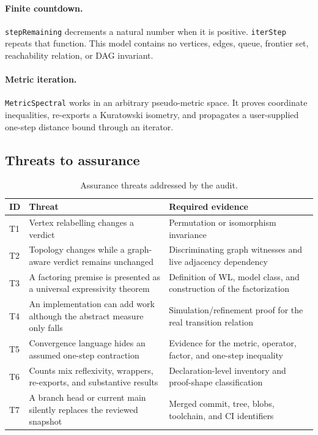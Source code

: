\documentclass[10pt,letterpaper]{article}
\theoremstyle{definition}
\begin{document}
\paragraph{Finite countdown.}
\texttt{stepRemaining} decrements a natural number when it is positive.
\texttt{iterStep} repeats that function. This model contains no vertices,
edges, queue, frontier set, reachability relation, or DAG invariant.

\paragraph{Metric iteration.}
\texttt{MetricSpectral} works in an arbitrary pseudo-metric space. It proves
coordinate inequalities, re-exports a Kuratowski isometry, and propagates a
user-supplied one-step distance bound through an iterator.

\subsection{Threats to assurance}
\begin{table}[ht]
\centering
\small
\begin{tabularx}{\textwidth}{@{}L{0.11\textwidth}L{0.28\textwidth}Y@{}}
\toprule
ID & Threat & Required evidence \\
\midrule
T1 & Vertex relabelling changes a verdict & Permutation or isomorphism invariance \\
T2 & Topology changes while a graph-aware verdict remains unchanged &
Discriminating graph witnesses and live adjacency dependency \\
T3 & A factoring premise is presented as a universal expressivity theorem &
Definition of WL, model class, and construction of the factorization \\
T4 & An implementation can add work although the abstract measure only falls &
Simulation/refinement proof for the real transition relation \\
T5 & Convergence language hides an assumed one-step contraction &
Evidence for the metric, operator, factor, and one-step inequality \\
T6 & Counts mix reflexivity, wrappers, re-exports, and substantive results &
Declaration-level inventory and proof-shape classification \\
T7 & A branch head or current main silently replaces the reviewed snapshot &
Merged commit, tree, blobs, toolchain, and CI identifiers \\
\bottomrule
\end{tabularx}
\caption{Assurance threats addressed by the audit.}
\label{tab:threats}
\end{table}
\end{document}
